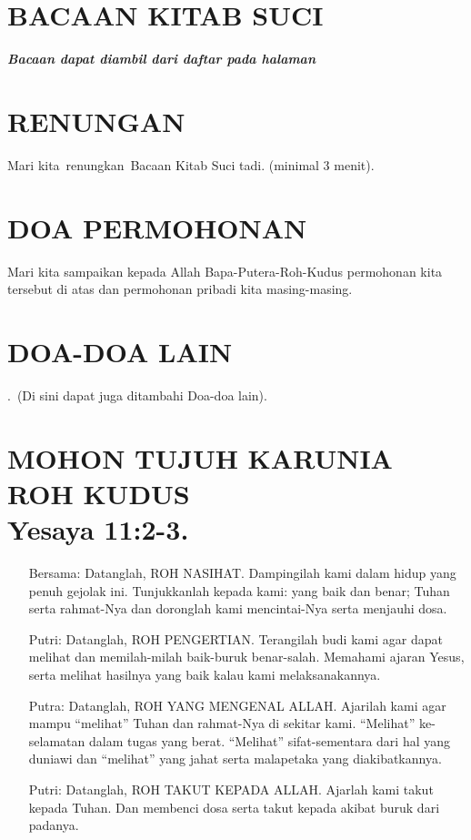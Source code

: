 \documentclass{scrartcl}
\newcommand{\roleSay}[2]{\begin{itemize} \item[#1:] #2 \end{itemize}}
\begin{document}
\section{BACAAN KITAB SUCI}
\textbf{\textit{Bacaan dapat diambil dari daftar pada halaman \pageref{bacaanLain}}}
\section{RENUNGAN}
Mari kita~renungkan~Bacaan Kitab Suci tadi. (minimal 3 menit).

\section{DOA PERMOHONAN}
Mari kita sampaikan kepada Allah
Bapa-Putera-Roh-Kudus permohonan kita tersebut di atas dan permohonan
pribadi kita masing-masing.

\section{DOA-DOA LAIN}.~(Di sini dapat juga ditambahi Doa-doa
lain).

\section{MOHON TUJUH KARUNIA ROH KUDUS\\{\small Yesaya
11:2-3.}}

\roleSay{Bersama}{Datanglah, ROH NASIHAT. Dampingilah kami dalam hidup yang
penuh gejolak ini. Tunjukkanlah kepada kami: yang baik dan benar; Tuhan serta rahmat-Nya dan doronglah kami mencintai-Nya serta
menjauhi dosa.}

\roleSay{Putri}{Datanglah, ROH PENGERTIAN. Terangilah budi kami agar dapat
melihat dan memilah-milah baik-buruk benar-salah. Memahami ajaran
Yesus, serta melihat hasilnya yang baik kalau kami melaksanakannya.}

\roleSay{Putra}{Datanglah, ROH YANG MENGENAL ALLAH. Ajarilah kami agar mampu
{\textquotedblleft}melihat{\textquotedblright} Tuhan dan rahmat-Nya di
sekitar kami. {\textquotedblleft}Melihat{\textquotedblright}
ke-selamatan dalam tugas yang berat.
{\textquotedblleft}Melihat{\textquotedblright} sifat-sementara dari hal
yang duniawi dan {\textquotedblleft}melihat{\textquotedblright} yang
jahat serta malapetaka yang diakibatkannya.}

\roleSay{Putri}{Datanglah, ROH TAKUT KEPADA ALLAH. Ajarlah kami takut kepada
Tuhan. Dan membenci dosa serta takut kepada akibat buruk dari padanya.}
\end{document}
